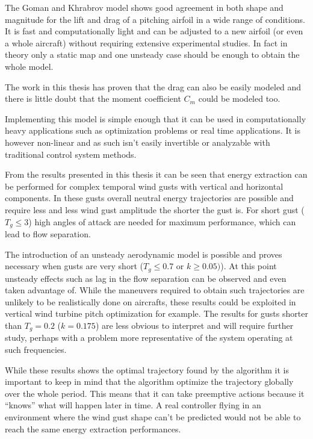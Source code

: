 
\par The Goman and Khrabrov model shows good agreement in both shape and magnitude for the lift and drag of a pitching airfoil in a wide range of conditions.
It is fast and computationally light and can be adjusted to a new airfoil (or even a whole aircraft) without requiring extensive experimental studies.
In fact in theory only a static map and one unsteady case should be enough to obtain the whole model.

\par The work in this thesis has proven that the drag can also be easily modeled and there is little doubt that the moment coefficient $C_m$ could be modeled too.

\par Implementing this model is simple enough that it can be used in computationally heavy applications such as optimization problems or real time applications.
It is however non-linear and as such isn't easily invertible or analyzable with traditional control system methods.


\par From the results presented in this thesis it can be seen that energy extraction can be performed for complex temporal wind gusts with vertical and horizontal components.
In these gusts overall neutral energy trajectories are possible and require less and less wind gust amplitude the shorter the gust is.
For short gust ($T_g \le 3$) high angles of attack are needed for maximum performance, which can lead to flow separation.

\par The introduction of an unsteady aerodynamic model is possible and proves necessary when gusts are very short ($T_g \le 0.7$ or $k \ge 0.05)$).
At this point unsteady effects such as lag in the flow separation can be observed and even taken advantage of.
While the maneuvers required to obtain such trajectories are unlikely to be realistically done on aircrafts, these results could be exploited in vertical wind turbine pitch optimization for example.
The results for gusts shorter than $T_g=0.2$ ($k=0.175$) are less obvious to interpret and will require further study, perhaps with a problem more representative of the system operating at such frequencies.

\par While these results shows the optimal trajectory found by the algorithm it is important to keep in mind that the algorithm optimize the trajectory globally over the whole period.
This means that it can take preemptive actions because it ``knows'' what will happen later in time.
A real controller flying in an environment where the wind gust shape can't be predicted would not be able to reach the same energy extraction performances.

